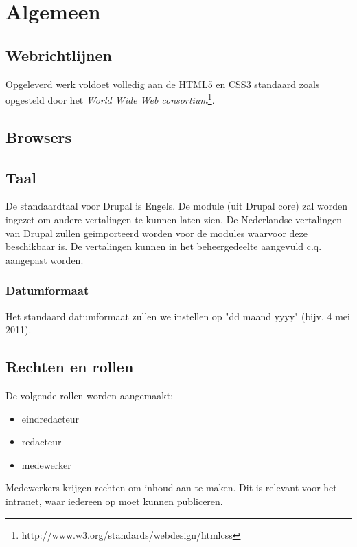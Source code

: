 \section{Algemeen}\label{algemeen}

\subsection{Webrichtlijnen}

Opgeleverd werk voldoet volledig aan de HTML5 en CSS3 standaard zoals opgesteld door het \emph{World Wide Web consortium}\footnote{http://www.w3.org/standards/webdesign/htmlcss}.

\subsection{Browsers}


\subsection{Taal}\label{taal}
De standaardtaal voor Drupal is Engels. De  module (uit Drupal core) zal worden ingezet om andere vertalingen te kunnen laten zien. De Nederlandse vertalingen van Drupal zullen ge\"{i}mporteerd worden voor de modules waarvoor deze beschikbaar is. De vertalingen kunnen in het beheergedeelte aangevuld c.q. aangepast worden.

\subsubsection{Datumformaat}
Het standaard datumformaat zullen we instellen op "dd maand yyyy" (bijv. 4 mei 2011).

\subsection{Rechten en rollen}\label{rollen}

De volgende rollen worden aangemaakt:
\begin{itemize}
\item eindredacteur
\item redacteur
\item medewerker
\end{itemize}
Medewerkers krijgen rechten om inhoud aan te maken. Dit is relevant voor het intranet, waar iedereen op moet kunnen publiceren.


